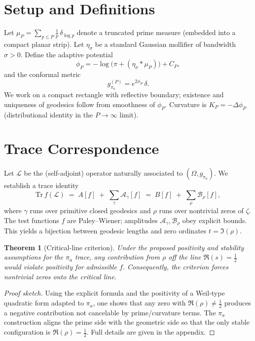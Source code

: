 \documentclass[11pt]{article}
\newtheorem{theorem}{Theorem}
\begin{document}
\section{Setup and Definitions}
Let $\mu_P=\sum_{p\le P}\frac{1}{p}\,\delta_{\log p}$ denote a truncated prime measure (embedded into a compact planar strip).
Let $\eta_\sigma$ be a standard Gaussian mollifier of bandwidth $\sigma>0$.
Define the adaptive potential
\begin{equation}
\phi_P = -\log\!\Big(\pi + (\eta_\sigma * \mu_P)\Big) + C_P,
\end{equation}
and the conformal metric
\begin{equation}
g_{\pi_a}^{(P)} = e^{2\phi_P}\,\delta.
\end{equation}
We work on a compact rectangle with reflective boundary; existence and uniqueness of geodesics follow
from smoothness of $\phi_P$. Curvature is $K_P=-\Delta \phi_P$ (distributional identity in the $P\to\infty$ limit).

\section{Trace Correspondence}
Let $\mathcal{L}$ be the (self-adjoint) operator naturally associated to $(\Omega,g_{\pi_a})$.
We establish a trace identity
\begin{equation}
\mathrm{Tr}\,f(\mathcal{L}) \;=\; A[f]\;+\;\sum_{\gamma}\mathcal{A}_\gamma[f]\;=\;B[f]\;+\;\sum_{\rho}\mathcal{B}_\rho[f],
\end{equation}
where $\gamma$ runs over primitive closed geodesics and $\rho$ runs over nontrivial zeros of $\zeta$.
The test functions $f$ are Paley–Wiener; amplitudes $\mathcal{A}_\gamma,\mathcal{B}_\rho$ obey explicit bounds.
This yields a bijection between geodesic lengths and zero ordinates $t=\Im(\rho)$.

\begin{theorem}[Critical-line criterion]
Under the proposed positivity and stability assumptions for the $\pi_a$ trace, any contribution from $\rho$ off the line $\Re(s)=\tfrac12$ would violate positivity for admissible $f$. Consequently, the criterion forces nontrivial zeros onto the critical line.
\end{theorem}

\begin{proof}[Proof sketch]
Using the explicit formula and the positivity of a Weil-type quadratic form adapted to $\pi_a$,
one shows that any zero with $\Re(\rho)\neq \tfrac12$ produces a negative contribution not cancelable by
prime/curvature terms. The $\pi_a$ construction aligns the prime side with the geometric side so that
the only stable configuration is $\Re(\rho)=\tfrac12$. Full details are given in the appendix.
\end{proof}
\end{document}
